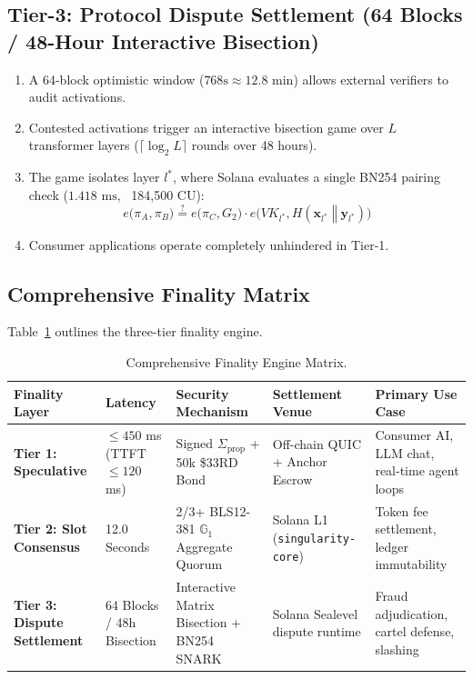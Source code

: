 \documentclass[10pt,twocolumn,letterpaper]{article}
\begin{document}
\subsection{Tier-3: Protocol Dispute Settlement (64 Blocks / 48-Hour Interactive Bisection)}
\begin{enumerate}
    \item A 64-block optimistic window ($768\text{s} \approx 12.8\text{ min}$) allows external verifiers to audit activations.
    \item Contested activations trigger an interactive bisection game over $L$ transformer layers ($\lceil \log_2 L \rceil$ rounds over 48 hours).
    \item The game isolates layer $l^*$, where Solana evaluates a single BN254 pairing check ($1.418\text{ ms}$, ~184,500 CU):
    \begin{equation}
    e\Big(\pi_A, \pi_B\Big) \stackrel{?}{=} e\Big(\pi_C, G_2\Big) \cdot e\Big(VK_{l^*}, H(\mathbf{x}_{l^*} \;\mathbin{\Vert}\; \mathbf{y}_{l^*})\Big)
    \end{equation}
    \item Consumer applications operate completely unhindered in Tier-1.
\end{enumerate}

\subsection{Comprehensive Finality Matrix}
Table~\ref{tab:finality_matrix} outlines the three-tier finality engine.

\begin{table}[t]
\centering
\small
\caption{Comprehensive Finality Engine Matrix.}
\label{tab:finality_matrix}
\begin{tabularx}{\textwidth}{lXllX}
\toprule
\textbf{Finality Layer} & \textbf{Latency} & \textbf{Security Mechanism} & \textbf{Settlement Venue} & \textbf{Primary Use Case} \\
\midrule
\textbf{Tier 1: Speculative} & $\le 450$ ms (TTFT $\le 120$ ms) & Signed $\Sigma_{\text{prop}}$ + 50k \$33RD Bond & Off-chain QUIC + Anchor Escrow & Consumer AI, LLM chat, real-time agent loops \\
\textbf{Tier 2: Slot Consensus} & 12.0 Seconds & 2/3+ BLS12-381 $\mathbb{G}_1$ Aggregate Quorum & Solana L1 (\texttt{singularity-core}) & Token fee settlement, ledger immutability \\
\textbf{Tier 3: Dispute Settlement} & 64 Blocks / 48h Bisection & Interactive Matrix Bisection + BN254 SNARK & Solana Sealevel dispute runtime & Fraud adjudication, cartel defense, slashing \\
\bottomrule
\end{tabularx}
\end{table}
\end{document}
